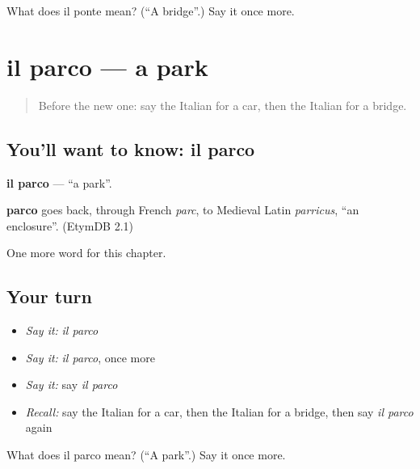 \begin{tcolorbox}[breakable,colback=teal!4,colframe=teal!35!black,title={Before you move on}]
What does il ponte mean? (\textquotedblleft{}A bridge\textquotedblright{}.) Say it once more.
\end{tcolorbox}
\section[il parco]{il parco — a park}

\label{lesson:IT-C83-parco}



\begin{quote}
Before the new one: say the Italian for a car, then the Italian for a bridge.
\end{quote}

\subsection*{You'll want to know: il parco}
\textbf{il parco} — \textquotedblleft{}a park\textquotedblright{}.

\begin{cousinweb}
\textbf{parco} goes back, through French \emph{parc}, to Medieval Latin \emph{parricus}, \textquotedblleft{}an enclosure\textquotedblright{}. (EtymDB 2.1)
\end{cousinweb}

\begin{grammarlens}[title={What you've built}]
One more word for this chapter.
\end{grammarlens}

\subsection*{Your turn}
\begin{itemize}
\raggedright
  \item \emph{Say it:} \emph{il parco}
  \item \emph{Say it:} \emph{il parco}, once more
  \item \emph{Say it:} say \emph{il parco}
  \item \emph{Recall:} say the Italian for a car, then the Italian for a bridge, then say \emph{il parco} again
\end{itemize}

\begin{tcolorbox}[breakable,colback=teal!4,colframe=teal!35!black,title={Before you move on}]
What does il parco mean? (\textquotedblleft{}A park\textquotedblright{}.) Say it once more.
\end{tcolorbox}

